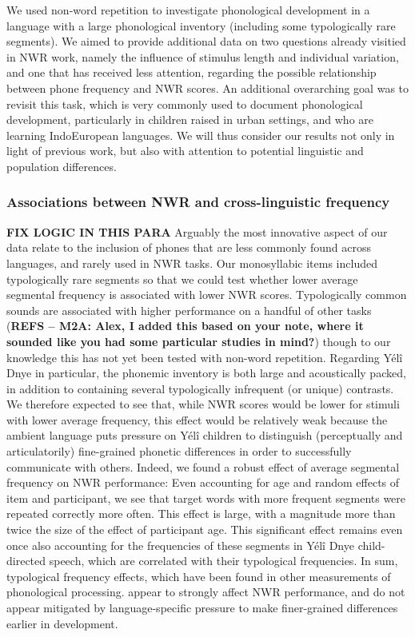 \documentclass[english,,man,floatsintext]{apa6}
\begin{document}
We used non-word repetition to investigate phonological development in a language with a large phonological inventory (including some typologically rare segments). We aimed to provide additional data on two questions already visitied in NWR work, namely the influence of stimulus length and individual variation, and one that has received less attention, regarding the possible relationship between phone frequency and NWR scores. An additional overarching goal was to revisit this task, which is very commonly used to document phonological development, particularly in children raised in urban settings, and who are learning IndoEuropean languages. We will thus consider our results not only in light of previous work, but also with attention to potential linguistic and population differences.

\hypertarget{associations-between-nwr-and-cross-linguistic-frequency}{%
\subsubsection{Associations between NWR and cross-linguistic frequency}\label{associations-between-nwr-and-cross-linguistic-frequency}}

\textbf{FIX LOGIC IN THIS PARA} Arguably the most innovative aspect of our data relate to the inclusion of phones that are less commonly found across languages, and rarely used in NWR tasks. Our monosyllabic items included typologically rare segments so that we could test whether lower average segmental frequency is associated with lower NWR scores. Typologically common sounds are associated with higher performance on a handful of other tasks (\textbf{REFS -- M2A: Alex, I added this based on your note, where it sounded like you had some particular studies in mind?}) though to our knowledge this has not yet been tested with non-word repetition. Regarding Yélî Dnye in particular, the phonemic inventory is both large and acoustically packed, in addition to containing several typologically infrequent (or unique) contrasts. We therefore expected to see that, while NWR scores would be lower for stimuli with lower average frequency, this effect would be relatively weak because the ambient language puts pressure on Yélî children to distinguish (perceptually and articulatorily) fine-grained phonetic differences in order to successfully communicate with others. Indeed, we found a robust effect of average segmental frequency on NWR performance: Even accounting for age and random effects of item and participant, we see that target words with more frequent segments were repeated correctly more often. This effect is large, with a magnitude more than twice the size of the effect of participant age. This significant effect remains even once also accounting for the frequencies of these segments in Yélî Dnye child-directed speech, which are correlated with their typological frequencies. In sum, typological frequency effects, which have been found in other measurements of phonological processing. appear to strongly affect NWR performance, and do not appear mitigated by language-specific pressure to make finer-grained differences earlier in development.
\end{document}
